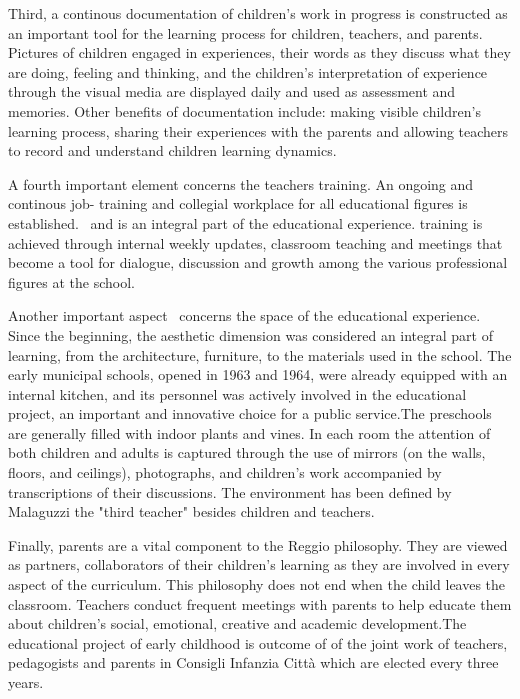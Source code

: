 \documentclass[12pt]{article}
\begin{document}
Third, a continous documentation of children's work in progress is
constructed as an important tool for the learning process for children,
teachers, and parents. Pictures of children engaged in experiences, their
words as they discuss what they are doing, feeling and thinking, and the
children's interpretation of experience through the visual media are
displayed daily and used as assessment and memories. Other benefits of
documentation include: making visible children's learning process, sharing
their experiences with the parents and allowing teachers to record and
understand children learning dynamics.

A fourth important element concerns the teachers training. An ongoing and
continous job- training and collegial workplace for all educational figures
is established. \ and is an integral part of the educational experience.
training is achieved through internal weekly updates, classroom teaching and
meetings that become a tool for dialogue, discussion and growth among the
various professional figures at the school.

Another important aspect \ concerns the space of the educational experience.
Since the beginning, the aesthetic dimension was considered an integral part
of learning, from the architecture, furniture, to the materials used in the
school. The early municipal schools, opened in 1963 and 1964, were already
equipped with an internal kitchen, and its personnel was actively involved
in the educational project, an important and innovative choice for a public
service.The preschools are generally filled with indoor plants and vines. In
each room  the attention of both children and adults is captured through the
use of mirrors (on the walls, floors, and ceilings), photographs, and
children's work accompanied by transcriptions of their discussions. The
environment has been defined by Malaguzzi  the "third teacher" besides
children and teachers.

Finally, parents are a vital component to the Reggio philosophy. They are
viewed as partners, collaborators of their children's learning as they are
involved in every aspect of the curriculum. This philosophy does not end
when the child leaves the classroom. Teachers conduct frequent meetings with
parents to help educate them about children's social, emotional, creative
and academic development.The educational project of early childhood is
outcome of of the joint work of teachers, pedagogists and parents in
Consigli Infanzia Citt\`{a} which are elected every three years.
\end{document}
